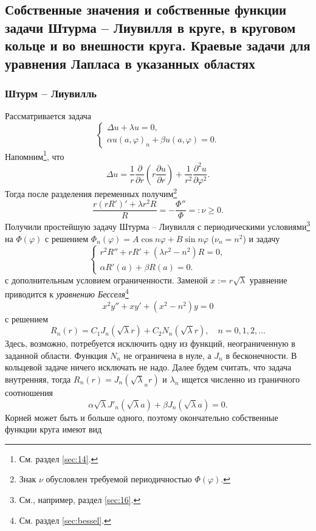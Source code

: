 \subsection{Собственные значения и собственные функции задачи Штурма -- Лиувилля
в круге, в круговом кольце и во внешности круга. Краевые задачи для уравнения
Лапласа в указанных областях}\label{sec:20}
\subsubsection{Штурм -- Лиувилль}
Рассматривается задача
\[
  \begin{cases}
    \Delta u + \lambda u = 0,\\
    \alpha u(a, \varphi)_n + \beta u(a, \varphi) = 0.
  \end{cases}
\]
Напомним\footnote{См. раздел \ref{sec:14}.}, что  
\[
    \Delta u = \frac{1}{r} \frac{\partial}{\partial r} \left( r \frac{\partial
    u}{\partial r} \right) + \frac{1}{r^2} \frac{\partial^2 u}{\partial
  \varphi^2}.
\]
Тогда после разделения переменных получим\footnote{Знак $ \nu $ обусловлен
требуемой периодичностью $ \Phi(\varphi) $.}
\[
    \frac{r (r R')' + \lambda r^2 R}{R} = - \frac{\Phi''}{\Phi} =: \nu \geqslant
    0.
\]
Получили простейшую задачу Штурма -- Лиувилля с периодическими
условиями\footnote{См., например, раздел \ref{sec:16}.}
на $ \Phi(\varphi) $ с решением $ \Phi_n(\varphi) = A\cos n\varphi + B\sin
n\varphi $ ($ \nu_n = n^2 $) и задачу
\[
  \begin{cases}
    r^2R'' + rR' + (\lambda r^2 - n^2) R = 0,\\
    \alpha R'(a) + \beta R(a) = 0.
  \end{cases}
\]
с дополнительным условием ограниченности. Заменой $ x := r\sqrt\lambda $
уравнение
приводится к \emph{уравнению Бесселя}\footnote{См. раздел \ref{sec:bessel}.} 
\[
    x^2y'' + xy' + (x^2 - n^2) y = 0
\]
с решением  
\[
    R_n(r) = C_1 J_n(\sqrt \lambda r) + C_2 N_n (\sqrt\lambda r), \quad n = 0,
    1, 2, \ldots
\]
Здесь, возможно, потребуется исключить одну из функций, неограниченную в
заданной области. Функция $ N_n $ не ограничена в нуле, а $ J_n $ в бесконечности.
В кольцевой задаче ничего исключать не надо. Далее будем считать, что задача
внутренняя, тогда $ R_n(r) = J_n(\sqrt\lambda_n r) $ и $ \lambda_n $ ищется
численно из
граничного соотношения  
\[
    \alpha \sqrt\lambda J'_n(\sqrt\lambda a) + \beta J_n(\sqrt\lambda a) = 0.
\]
Корней может быть и больше одного, поэтому окончательно собственные функции
круга имеют вид 
